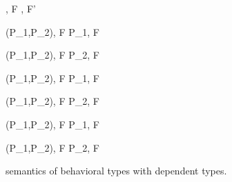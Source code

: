 \begin{figure}
\begin{minipage}{\textwidth}
{ \langle \Endconst, F \rangle \rightarrow {}, F' \rangle }


\begin{minipage}{0.5\textwidth}
{ \langle \Sirx (P_1,P_2), F \rangle \xlongrightarrow{\snull} \langle P_1, F \rangle }
\end{minipage}
\begin{minipage}{0.5\textwidth}
{ \langle \Sirx (P_1,P_2), F \rangle \xlongrightarrow{\snnull} \langle P_2, F \rangle }
\end{minipage}
\vspace{2mm}

\begin{minipage}{0.5\textwidth}
{ \langle \Sirx (P_1,P_2), F \rangle \rightarrow \langle P_1, F \rangle }
\end{minipage}
\begin{minipage}{0.5\textwidth}
{ \langle \Sirx (P_1,P_2), F \rangle \rightarrow \langle P_2, F \rangle }
\end{minipage}


{ \langle \Sirx (P_1,P_2), F \rangle \xlongrightarrow{\snull} \langle P_1, F\cup{\snull} \rangle }

{ \langle \Sirx (P_1,P_2), F \rangle \xlongrightarrow{\snnull} \langle P_2, F\cup{\snnull} \rangle }

 



\end{minipage}
\caption{semantics of behavioral types with dependent types.}
\label{fig:bdRules}
\end{figure}

